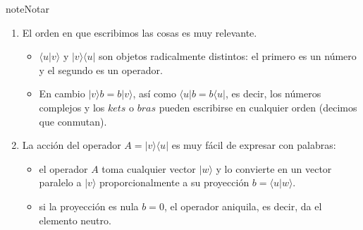 \documentclass[letterpaper,10pt,english]{jupyterBook}
\newcommand{\bra}[1]{\langle #1|}
\newcommand{\ket}[1]{|#1\rangle}
\newcommand{\braket}[2]{\langle #1|#2\rangle}
\newcommand{\ketbra}[2]{| #1\rangle \langle #2 |}
\begin{document}
\begin{sphinxadmonition}{note}{Notar}
\begin{enumerate}
%
\item {} 
\sphinxAtStartPar
El orden en que escribimos las cosas es muy relevante.
\begin{itemize}
\item {} 
\sphinxAtStartPar
\(\braket{u}{v}\) y \(\ketbra{v}{u}\) son objetos  radicalmente distintos: el primero es un número y el segundo es un operador.

\item {} 
\sphinxAtStartPar
En cambio \(\ket{v} b  = b \ket{v}\), así como \(\bra{u}b = b\bra{u}\), es decir,  los números complejos y los \(kets\) o \(bras\) pueden escribirse en cualquier orden (decimos que conmutan).

\end{itemize}

\item {} 
\sphinxAtStartPar
La acción del operador  \(A = \ket{v}\bra{u}\) es muy fácil de expresar con palabras:
\begin{itemize}
\item {} 
\sphinxAtStartPar
el operador \(A\) toma cualquier vector \(\ket{w}\) y lo convierte en un vector paralelo a \(\ket{v}\) proporcionalmente a su proyección \(b=\braket{u}{w}\).

\item {} 
\sphinxAtStartPar
si la proyección es nula \(b=0\), el operador aniquila, es decir, da el elemento neutro.

\end{itemize}

\end{enumerate}
\end{sphinxadmonition}
\end{document}
